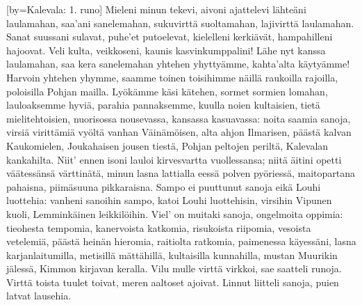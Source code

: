 %
\setcounter{songnum}{700}


[by={Kalevala: 1. runo}]
  \beginverse
    Mieleni minun tekevi,
    aivoni ajattelevi
    lähteäni laulamahan,
    saa'ani sanelemahan,
    sukuvirttä suoltamahan,
    lajivirttä laulamahan.
    Sanat suussani sulavat,
    puhe'et putoelevat,
    kielelleni kerkiävät,
    hampahilleni hajoovat.
    Veli kulta, veikkoseni,
    kaunis kasvinkumppalini!
    Lähe nyt kanssa laulamahan,
    saa kera sanelemahan
    yhtehen yhyttyämme,
    kahta'alta käytyämme!
    Harvoin yhtehen yhymme,
    saamme toinen toisihimme
    näillä raukoilla rajoilla,
    poloisilla Pohjan mailla.
  \endverse
  \beginverse
    Lyökämme käsi kätehen,
    sormet sormien lomahan,
    lauloaksemme hyviä,
    parahia pannaksemme,
    kuulla noien kultaisien,
    tietä mielitehtoisien,
    nuorisossa nousevassa,
    kansassa kasuavassa:
    noita saamia sanoja,
    virsiä virittämiä
    vyöltä vanhan Väinämöisen,
    alta ahjon Ilmarisen,
    päästä kalvan Kaukomielen,
    Joukahaisen jousen tiestä,
    Pohjan peltojen periltä,
    Kalevalan kankahilta.
    Niit' ennen isoni lauloi
    kirvesvartta vuollessansa;
    niitä äitini opetti
    väätessänsä värttinätä,
    minun lasna lattialla
    eessä polven pyöriessä,
    maitopartana pahaisna,
    piimäsuuna pikkaraisna.
    Sampo ei puuttunut sanoja
    eikä Louhi luottehia:
    vanheni sanoihin sampo,
    katoi Louhi luottehisin,
    virsihin Vipunen kuoli,
    Lemminkäinen leikkilöihin.
  \endverse
  \beginverse
    Viel' on muitaki sanoja,
    ongelmoita oppimia:
    tieohesta tempomia,
    kanervoista katkomia,
    risukoista riipomia,
    vesoista vetelemiä,
    päästä heinän hieromia,
    raitiolta ratkomia,
    paimenessa käyessäni,
    lasna karjanlaitumilla,
  \endverse
  \beginverse
    metisillä mättähillä,
    kultaisilla kunnahilla,
    mustan Muurikin jälessä,
    Kimmon kirjavan keralla.
    Vilu mulle virttä virkkoi,
    sae saatteli runoja.
    Virttä toista tuulet toivat,
    meren aaltoset ajoivat.
    Linnut liitteli sanoja,
    puien latvat lausehia.
